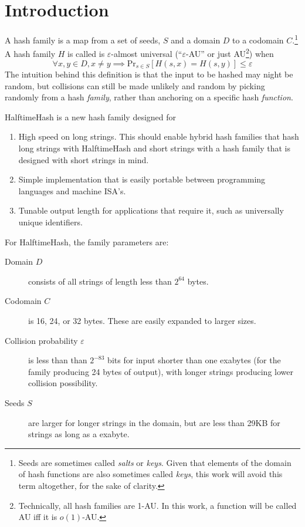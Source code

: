 \documentclass[acmsmall, nonacm]{acmart}
\begin{document}
\section{Introduction}
A hash family is a map from a set of seeds, $S$ and a domain $D$ to a codomain $C$.\footnote{Seeds are sometimes called {\em salts} or {\em keys}. Given that elements of the domain of hash functions are also sometimes called {\em keys}, this work will avoid this term altogether, for the sake of clarity.}
A hash family $H$ is called is $\varepsilon$-almost universal (``$\varepsilon$-AU'' or just AU\footnote{Technically, all hash families are 1-AU. In this work, a function will be called AU iff it is $o(1)$-AU.}) when
\[\forall x,y \in D, x \neq y \implies \mathrm{Pr}_{s \in S}[H(s, x) = H(s, y)] \leq \varepsilon\]
The intuition behind this definition is that the input to be hashed may night be random, but collisions can still be made unlikely and random by picking randomly from a hash {\em family}, rather than anchoring on a specific hash {\em function}.

HalftimeHash is a new hash family designed for

\begin{enumerate}
\item High speed on long strings.
  This should enable hybrid hash families that hash long strings with HalftimeHash and short strings with a hash family that is designed with short strings in mind. \cite{siphash,umash}
\item Simple implementation that is easily portable between programming languages and machine ISA's.
\item Tunable output length for applications that require it, such as universally unique identifiers.
\end{enumerate}

For HalftimeHash, the family parameters are:

\begin{description}
\item[Domain $D$] consists of all strings of length less than $2^{64}$ bytes.
\item[Codomain $C$] is 16, 24, or 32 bytes.
  These are easily expanded to larger sizes.
\item[Collision probability $\varepsilon$] is less than than $2^{-83}$ bits for input shorter than one exabytes (for the family producing 24 bytes of output), with longer strings producing lower collision possibility.
\item[Seeds $S$] are larger for longer strings in the domain, but are less than 29KB for strings as long as a exabyte.
\end{description}
\end{document}
